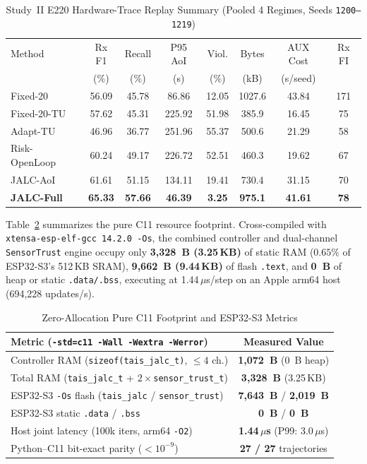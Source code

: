 \documentclass[journal,twoside,web]{ieeecolor}
\begin{document}
\begin{table}[t]
\centering
\caption{Study~II E220 Hardware-Trace Replay Summary (Pooled 4 Regimes, Seeds \texttt{1200--1219})}
\label{tab:p55_hw}
\scriptsize
\setlength{\tabcolsep}{2.2pt}
\begin{tabular}{@{}lccccccc@{}}
\toprule
Method & Rx F1 & Recall & P95 AoI & Viol. & Bytes & AUX Cost & Rx FI \\
 & (\%) & (\%) & (s) & (\%) & (kB) & (s/seed) & \\
\midrule
Fixed-20 & 56.09 & 45.78 & 86.86 & 12.05 & 1027.6 & 43.84 & 171 \\
Fixed-20-TU & 57.62 & 45.31 & 225.92 & 51.98 & 385.9 & 16.45 & 75 \\
Adapt-TU & 46.96 & 36.77 & 251.96 & 55.37 & 500.6 & 21.29 & 58 \\
Risk-OpenLoop & 60.24 & 49.17 & 226.72 & 52.51 & 460.3 & 19.62 & 67 \\
JALC-AoI & 61.61 & 51.15 & 134.11 & 19.41 & 730.4 & 31.15 & 70 \\
\textbf{JALC-Full} & \textbf{65.33} & \textbf{57.66} & \textbf{46.39} & \textbf{3.25} & \textbf{975.1} & \textbf{41.61} & \textbf{78} \\
\bottomrule
\end{tabular}
\end{table}

Table~\ref{tab:c11} summarizes the pure C11 resource footprint. Cross-compiled with \texttt{xtensa-esp-elf-gcc 14.2.0 -Os}, the combined controller and dual-channel \texttt{SensorTrust} engine occupy only \textbf{3,328~B (3.25\,KB)} of static RAM ($0.65\%$ of ESP32-S3's 512\,KB SRAM), \textbf{9,662~B (9.44\,KB)} of flash \texttt{.text}, and \textbf{0~B} of heap or static \texttt{.data/.bss}, executing at 1.44\,$\mu$s/step on an Apple arm64 host (694,228 updates/s).

\begin{table}[t]
\centering
\caption{Zero-Allocation Pure C11 Footprint and ESP32-S3 Metrics}
\label{tab:c11}
\scriptsize
\setlength{\tabcolsep}{4pt}
\begin{tabular}{@{}lc@{}}
\toprule
Metric (\texttt{-std=c11 -Wall -Wextra -Werror}) & Measured Value \\
\midrule
Controller RAM (\texttt{sizeof(tais\_jalc\_t)}, $\le 4$ ch.) & \textbf{1,072~B} (0~B heap) \\
Total RAM (\texttt{tais\_jalc\_t} + $2{\times}$\texttt{sensor\_trust\_t}) & \textbf{3,328~B} (3.25\,KB) \\
ESP32-S3 \texttt{-Os} flash (\texttt{tais\_jalc} / \texttt{sensor\_trust}) & \textbf{7,643~B} / \textbf{2,019~B} \\
ESP32-S3 static \texttt{.data} / \texttt{.bss} & \textbf{0~B} / \textbf{0~B} \\
Host joint latency (100k iters, arm64 \texttt{-O2}) & \textbf{1.44\,$\mu$s} (P99: 3.0\,$\mu$s) \\
Python--C11 bit-exact parity ($<10^{-9}$) & \textbf{27 / 27} trajectories \\
\bottomrule
\end{tabular}
\end{table}
\end{document}
